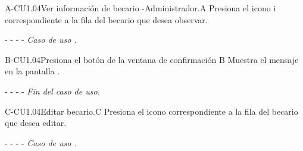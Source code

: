 \begin{UCtrayectoriaA}{A-CU1.04}{Ver información de becario -Administrador.}{A}
	     \UCpaso[\UCactor]Presiona el icono \textcircled{i} correspondiente a la fila del becario que desea observar.
	    \item[- -] - - {\em Caso de uso .}
	\end{UCtrayectoriaA}
	
	\begin{UCtrayectoriaA}{B-CU1.04}{Presiona el botón  de la ventana de confirmación }{B}
		\UCpaso[\UCsist] Muestra el mensaje  en la pantalla .
		\item[- -] - - {\em Fin del caso de uso.} 
	\end{UCtrayectoriaA}


\begin{UCtrayectoriaA}{C-CU1.04}{Editar becario.}{C}
	     \UCpaso[\UCactor]Presiona el icono  \faEdit correspondiente a la fila del becario que desea editar.
	     
	    \item[- -] - - {\em Caso de uso .}
	\end{UCtrayectoriaA}